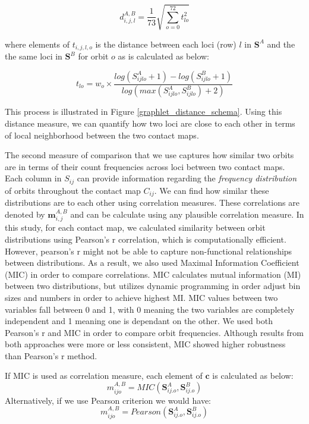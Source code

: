 \documentclass[a4,center,fleqn]{NAR}
\begin{document}
\begin{equation}
    d^{\scriptscriptstyle A,B}_{i,j,l} = 
    \frac{1}{73}\sqrt{\sum_{o=0}^{72}{t_{lo}^2}}
    \label{eq:distance_total}
\end{equation}

where elements of $t_{i,j,l,o}$ is the
distance between each
loci (row) $l$ in $\mathbf{S}^A$ and the the same loci in 
$\mathbf{S}^B$ for
orbit $o$ as is calculated as below:

\begin{equation}
    t_{lo} = w_o \times 
    \frac{log(S_{ijlo}^A+1) - log(S_{ijlo}^B+1)}
    {log(max(S_{ijlo}^A, S_{ijlo}^B) + 2)}
    \label{eq:distance_single}
\end{equation}


This process is illustrated in Figure \ref{graphlet_distance_schema}.
Using this distance measure, we can quantify how two loci are close to
each other in terms of local neighborhood between the two contact maps.

The second measure of comparison that we use captures how 
similar two orbits are in terms of their count 
frequencies across loci between two contact maps. 
Each column in $S_{ij}$ can provide information
regarding the \textit{frequency distribution} of orbits throughout
the contact map $C_{ij}$. 
We can find how similar these distributions are to each other using
correlation measures.
These correlations are denoted by $\mathbf{m}^{\scriptscriptstyle A,B}_{i,j}$ and
can be calculate using
any plausible correlation measure. 
In this study, for each contact map,  we calculated
similarity between orbit distributions using Pearson's r 
correlation, which is computationally efficient.
However, pearson's r might not be able to capture
non-functional relationships between distributions. As a result, we
also used Maximal Information Coefficient (MIC) 
\cite{reshef2011detecting} in order to compare
correlations. MIC calculates mutual information (MI) between two
distributions, but utilizes dynamic programming in order adjust
bin sizes and numbers in order to achieve highest MI.
MIC values between two variables fall between 0 and 1,
with 0 meaning the two variables are completely independent
and 1 meaning one is dependant on the other.
We used both Pearson's r and MIC in order to compare orbit
frequencies. Although results from both approaches were more
or less consistent, MIC showed higher robustness than Pearson's 
r method.

If MIC is used as correlation measure, each element of 
 $\mathbf{c}$ is calculated as below:
\begin{equation}
    m^{\scriptscriptstyle A,B}_{ijo} = MIC(\mathbf{S}^A_{ij.o}, \mathbf{S}^B_{ij.o})
    \label{eq:mic}
\end{equation}
Alternatively, if we use Pearson criterion we would have:
\begin{equation}
    m^{\scriptscriptstyle A,B}_{ijo} = Pearson(\mathbf{S}^A_{ij.o}, \mathbf{S}^B_{ij.o})
    \label{eq:pearson}
\end{equation}
\end{document}
